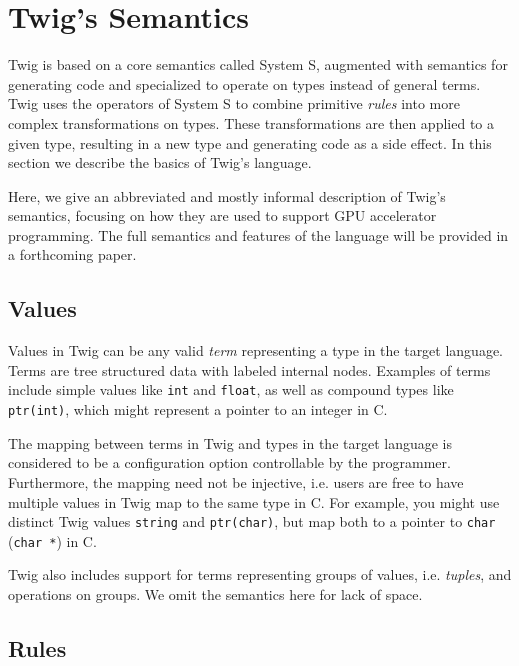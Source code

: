 
\section{Twig's Semantics}
\label{semantics}

Twig is based on a core semantics called System S\cite{Visser:1998p333}, augmented with semantics for generating code and specialized to operate on types instead of general terms. Twig uses the operators of System S to combine primitive \emph{rules} into more complex transformations on types. These transformations are then applied to a given type, resulting in a new type and generating code as a side effect. In this section we describe the basics of Twig's language.

Here, we give an abbreviated and mostly informal description of Twig's semantics, focusing on how they are used to support GPU accelerator programming. The full semantics and features of the language will be provided in a forthcoming paper.

\subsection{Values}

Values in Twig can be any valid \emph{term} representing a type in the target language. Terms are tree structured data with labeled internal nodes. Examples of terms include simple values like \texttt{int} and \texttt{float}, as well as compound types like \texttt{ptr(int)}, which might represent a pointer to an integer in C.

The mapping between terms in Twig and types in the target language is considered to be a configuration option controllable by the programmer. Furthermore, the mapping need not be injective, i.e. users are free to have multiple values in Twig map to the same type in C. For example, you might use distinct Twig values \texttt{string} and \texttt{ptr(char)}, but map both to a pointer to \texttt{char} (\texttt{char *}) in C.

Twig also includes support for terms representing groups of values, i.e. \emph{tuples}, and operations on groups. We omit the semantics here for lack of space.

\subsection{Rules}
\label{sec:rules}

